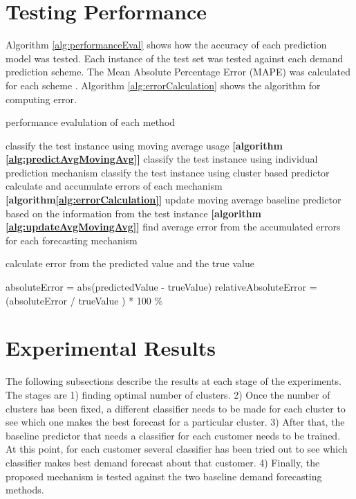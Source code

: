 \section{Testing Performance}
Algorithm \ref{alg:performanceEval} shows how the accuracy of each prediction model was tested. Each instance of the test set was tested against each demand prediction scheme. The Mean Absolute Percentage Error (MAPE) was calculated for each scheme \cite{witten2005data}. Algorithm \ref{alg:errorCalculation} shows the algorithm for computing error.
 
\begin{algorithm}
\caption{performance evalulation of each method}
\begin{algorithmic} [1]
    \STATE classify the test instance using moving average usage \textbf{[algorithm \ref{alg:predictAvgMovingAvg}]}
    \STATE classify the test instance using individual prediction mechanism
    \STATE classify the test instance using cluster based predictor
    \STATE calculate and accumulate errors of each mechanism \textbf{[algorithm\ref{alg:errorCalculation}]}
    \STATE update moving average baseline predictor based on the information from the test instance \textbf{[algorithm \ref{alg:updateAvgMovingAvg}]}
\ENDFOR 
\STATE find average error from the accumulated errors for each forecasting mechanism
\end{algorithmic}
\label{alg:performanceEval}
\end{algorithm}
\begin{algorithm} [!h]
\caption{calculate error from the predicted value and the true value}
\begin{algorithmic} [1]
\STATE absoluteError = abs(predictedValue - trueValue)
\STATE relativeAbsoluteError = (absoluteError / trueValue ) * 100 \%
\end{algorithmic}
\label{alg:errorCalculation}
\end{algorithm}

\section{Experimental Results}

The following subsections describe the results at each stage of the experiments. The stages are 1) finding optimal number of clusters. 2) Once the number of clusters has been fixed, a different classifier needs to be made for each cluster to see which one makes the best forecast for a particular cluster. 3) After that, the baseline predictor that needs a classifier for each customer needs to be trained. At this point, for each customer several classifier has been tried out to see which classifier makes best demand forecast about that customer. 4) Finally, the proposed mechanism is tested against the two baseline demand forecasting methods.

